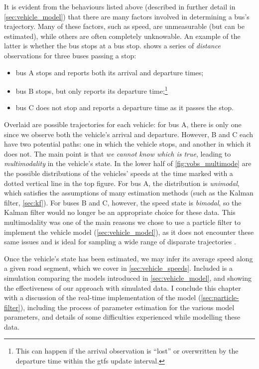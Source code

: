 It is evident from the behaviours listed above (described in further detail in \cref{sec:vehicle_model}) that there are many factors involved in determining a bus's trajectory. Many of these factors, such as speed, are unmeasurable (but can be estimated), while others are often completely unknowable. An example of the latter is whether the bus stops at a bus stop.  shows a series of \emph{distance} observations for three buses passing a stop:
\begin{itemize}
\item bus A stops and reports both its arrival and departure times;
\item bus B stops, but only reports its departure time;\footnote{This can happen if the arrival observation is ``lost'' or overwritten by the departure time within the \gls{gtfs} update interval.}
\item bus C does not stop and reports a departure time as it passes the stop.
\end{itemize}
Overlaid are possible trajectories for each vehicle: for bus A, there is only one since we observe both the vehicle's arrival and departure. However, B and C each have two potential paths: one in which the vehicle stops, and another in which it does not. The main point is that \emph{we cannot know which is true}, leading to \emph{multimodality} in the vehicle's state. In the lower half of \cref{fig:vobs_multimode} are the possible distributions of the vehicles' speeds at the time marked with a dotted vertical line in the top figure. For bus A, the distribution is \emph{unimodal}, which satisfies the assumptions of many estimation methods (such as the Kalman filter, \cref{sec:kf}). For buses B and C, however, the speed state is \emph{bimodal}, so the Kalman filter would no longer be an appropriate choice for these data. This multimodality was one of the main reasons we chose to use a particle filter to implement the vehicle model (\cref{sec:vehicle_model}), as it does not encounter these same issues and is ideal for sampling a wide range of disparate trajectories \citep{Hans_2015,Ulmke_2006}.

Once the vehicle's state has been estimated, we may infer its average speed along a given road segment, which we cover in \cref{sec:vehicle_speeds}. Included is a simulation comparing the models introduced in \cref{sec:vehicle_model}, and showing the effectiveness of our approach with simulated data. I conclude this chapter with a discussion of the real-time implementation of the model (\cref{sec:particle-filter}), including the process of parameter estimation for the various model parameters, and details of some difficulties experienced while modelling these data.










